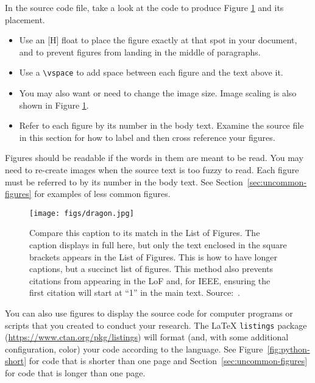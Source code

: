 In the source code file, take a look at the code to produce Figure \ref{fig:dragon} and its placement.
\begin{itemize}
    \item Use an [H] float to place the figure exactly at that spot in your document, and to prevent figures from landing in the middle of paragraphs. 
    \item Use a \verb+\vspace+ to add space between each figure and the text above it. 
    \item You may also want or need to change the image size. Image scaling is also shown in Figure \ref{fig:dragon}.  
    \item Refer to each figure by its number in the body text. Examine the source file in this section for how to label and then cross reference your figures.
\end{itemize}

Figures should be readable if the words in them are meant to be read. You may need to re-create images when the source text is too fuzzy to read. Each figure must be referred to by its number in the body text.
See Section~\ref{sec:uncommon-figures} for examples of less common figures.

\begin{figure}[H] %
    \centering
    \texttt{[image: figs/dragon.jpg]}
    \caption[Short caption for List of Figures only; full caption in main text.]{Compare this caption to its match in the List of Figures. The caption displays in full here, but only the text enclosed in the square brackets appears in the List of Figures. This is how to have longer captions, but a succinct list of figures. This method also prevents citations from appearing in the LoF and, for IEEE, ensuring the first citation will start at ``1'' in the main text.  Source:~\citet{pollan_2006}.}
    \label{fig:dragon} %
\end{figure}

You can also use figures to display the source code for computer programs or scripts that you created to conduct your research.
The \LaTeX{} \verb|listings| package (\url{https://www.ctan.org/pkg/listings}) will format (and, with some additional configuration, color) your code according to the language.
See Figure~\ref{fig:python-short} for code that is shorter than one page and Section~\ref{sec:uncommon-figures} for code that is longer than one page.

